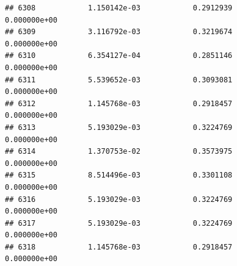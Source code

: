\documentclass[
]{article}
\begin{document}
\begin{verbatim}
## 6308            1.150142e-03            0.2912939            0.000000e+00
## 6309            3.116792e-03            0.3219674            0.000000e+00
## 6310            6.354127e-04            0.2851146            0.000000e+00
## 6311            5.539652e-03            0.3093081            0.000000e+00
## 6312            1.145768e-03            0.2918457            0.000000e+00
## 6313            5.193029e-03            0.3224769            0.000000e+00
## 6314            1.370753e-02            0.3573975            0.000000e+00
## 6315            8.514496e-03            0.3301108            0.000000e+00
## 6316            5.193029e-03            0.3224769            0.000000e+00
## 6317            5.193029e-03            0.3224769            0.000000e+00
## 6318            1.145768e-03            0.2918457            0.000000e+00
\end{verbatim}
\end{document}
